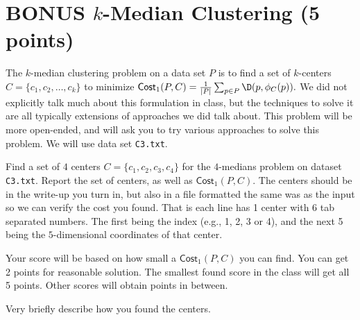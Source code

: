 \documentclass[11pt]{article}
\begin{document}
\section{BONUS $k$-Median Clustering (5 points)}
The $k$-median clustering problem on a data set $P$ is to find a set of $k$-centers $C = \{c_1, c_2, \ldots, c_k\}$ to minimize
$
\textsf{Cost}_1(P,C) = \frac{1}{|P|}\sum_{p \in P} \D(p, \phi_C(p)).
$
We did not explicitly talk much about this formulation in class, but the techniques to solve it are all typically extensions of approaches we did talk about.  This problem will be more open-ended, and will ask you to try various approaches to solve this problem.  We will use data set \texttt{C3.txt}.  


Find a set of $4$ centers $C = \{c_1, c_2, c_3, c_4\}$ for the $4$-medians problem on dataset \texttt{C3.txt}.  Report the set of centers, as well as $\textsf{Cost}_1(P,C)$.  The centers should be in the write-up you turn in, but also in a file formatted the same was as the input so we can verify the cost you found.  That is each line has 1 center with 6 tab separated numbers.  The first being the index (e.g., 1, 2, 3 or 4), and the next 5 being the $5$-dimensional coordinates of that center.  

Your score will be based on how small a $\textsf{Cost}_1(P,C)$ you can find.   You can get 2 points for reasonable solution.  The smallest found score in the class will get all 5 points.  Other scores will obtain points in between.  

Very briefly describe how you found the centers.  
\end{document}
